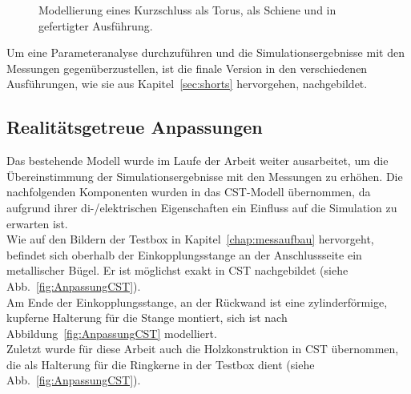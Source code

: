             \begin{figure}[htb]
                \centering
                \hspace{0.01\textwidth}
                \hspace{0.01\textwidth}
                \caption{Modellierung eines Kurzschluss \protect{} als Torus, \protect{} als Schiene und \protect{} in gefertigter Ausführung.}
                \label{fig:KSCST}
            \end{figure}
        
        Um eine Parameteranalyse durchzuführen und die Simulationsergebnisse mit den Messungen gegenüberzustellen, ist die finale Version in den verschiedenen Ausführungen, wie sie aus Kapitel~\ref{sec:shorts} hervorgehen, nachgebildet.
        
        \subsection{Realitätsgetreue Anpassungen}
        Das bestehende Modell wurde im Laufe der Arbeit weiter ausarbeitet, um die Übereinstimmung der Simulationsergebnisse mit den Messungen zu erhöhen. Die nachfolgenden Komponenten wurden in das CST-Modell übernommen, da aufgrund ihrer di-/elektrischen Eigenschaften ein Einfluss auf die Simulation zu erwarten ist.\\
        Wie auf den Bildern der Testbox in Kapitel~\ref{chap:messaufbau} hervorgeht, befindet sich oberhalb der Einkopplungsstange an der Anschlussseite ein metallischer Bügel. Er ist möglichst exakt in CST nachgebildet (siehe Abb.~\ref{fig:AnpassungCST}).\\
        Am Ende der Einkopplungsstange, an der Rückwand ist eine zylinderförmige, kupferne Halterung für die Stange montiert, sich ist nach Abbildung~\ref{fig:AnpassungCST} modelliert.\\
        Zuletzt wurde für diese Arbeit auch die Holzkonstruktion in CST übernommen, die als Halterung für die Ringkerne in der Testbox dient (siehe Abb.~\ref{fig:AnpassungCST}).
        
